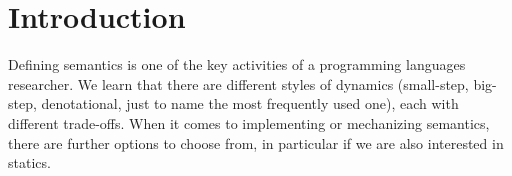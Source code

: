 \documentclass[acmsmall,anonymous,review,screen]{acmart}
\begin{document}




\maketitle

\section{Introduction}
\label{sec:introduction}

Defining semantics is one of the key activities of a programming
languages researcher. We learn that there are different styles of
dynamics (small-step, big-step, denotational, just to name the most
frequently used one), each with different trade-offs. When it comes to
implementing or mechanizing semantics, there are further options to
choose from, in particular if we are also interested in statics.
\end{document}
